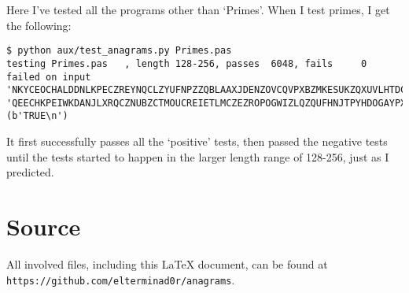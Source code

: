 \documentclass{article}
\begin{document}
    Here I've tested all the programs other than `Primes'. When I test primes,
    I get the following:

\begin{lstlisting}[caption=Testing `Primes']
$ python aux/test_anagrams.py Primes.pas
testing Primes.pas   , length 128-256, passes  6048, fails     0               
failed on input 'NKYCEOCHALDDNLKPECZREYNQCLZYUFNPZZQBLAAXJDENZOVCQVPXBZMKESUKZQXUVLHTDCIJVAEQFHHWVVCDPJWSIOKIKUVJIGSKPQMDMUDDWFMZYPATESQNTBUYHRZDHBWADIXBCEKSQQYZVOEIXPZLOCIOVLQHDEKEPRAHQCOAEEMYUECGGCPACBRSQXT', 'QEECHKPEIWKDANJLXRQCZNUBZCTMOUCREIETLMCZEZROPOGWIZLQZQUFHNJTPYHDOGAYPXBBNSETCULSVCSKJBAYQAFYLQXECVQKDTVXANQODDHJMSQPDAHOXEZEZCSEGVXBMYLHUPIEISZNVKQCVCKKOHVRIWYIAKDBYAUVLMDEKVWPACDDHQZFPZQDUEC' (b'TRUE\n')
\end{lstlisting}
\iffalse $ \fi %

    It first successfully passes all the `positive' tests, then passed the
    negative tests until the tests started to happen in the larger length range
    of 128-256, just as I predicted.

    \section{Source}

    All involved files, including this \LaTeX{} document, can be found at
    \verb|https://github.com/elterminad0r/anagrams|.
\end{document}
